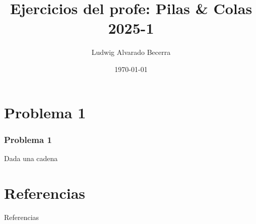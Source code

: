 \documentclass[17pt, t, lualatex]{beamer}
\title{\LARGE Ejercicios del profe: Pilas \& Colas 2025-1}
\date{\today}
\institute[UJTL]{Universidad Jorge Tadeo Lozano - Semillero de Programación Competitiva}
\author{Ludwig Alvarado Becerra}
\begin{document}
\inserttitlepage

\section{Problema 1}

\insertsectionpage


\begin{frame}
  \frametitle{Problema 1}

  Dada una cadena

\end{frame}




\section{Referencias}

\insertsectionpage
\begin{frame}[allowframebreaks]{Referencias}
  \printbibliography
\end{frame}


\insertendpage
\end{document}
